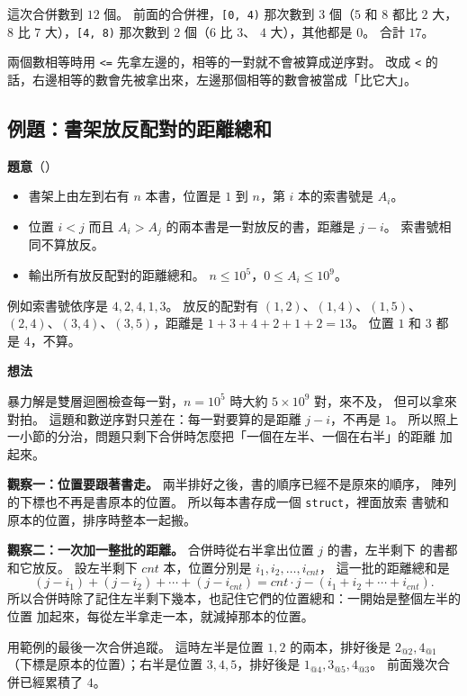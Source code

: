 這次合併數到 $12$ 個。 前面的合併裡，\texttt{[0, 4)} 那次數到 $3$ 個（$5$ 和
$8$ 都比 $2$ 大，$8$ 比 $7$ 大），\texttt{[4, 8)} 那次數到 $2$ 個（$6$ 比 $3$、
$4$ 大），其他都是 $0$。 合計 $17$。

兩個數相等時用 \texttt{<=} 先拿左邊的，相等的一對就不會被算成逆序對。 改成
\texttt{<} 的話，右邊相等的數會先被拿出來，左邊那個相等的數會被當成「比它大」。

\subsection{例題：書架放反配對的距離總和}
\label{sec:rec-ex-books}

\textbf{題意}（）

\begin{itemize}
\item 書架上由左到右有 $n$ 本書，位置是 $1$ 到 $n$，第 $i$ 本的索書號是
$A_i$。
\item 位置 $i < j$ 而且 $A_i > A_j$ 的兩本書是一對放反的書，距離是 $j - i$。
索書號相同不算放反。
\item 輸出所有放反配對的距離總和。 $n \le 10^5$，$0 \le A_i \le 10^9$。
\end{itemize}

例如索書號依序是 $4, 2, 4, 1, 3$。 放反的配對有 $(1,2)$、$(1,4)$、$(1,5)$、
$(2,4)$、$(3,4)$、$(3,5)$，距離是 $1 + 3 + 4 + 2 + 1 + 2 = 13$。 位置 $1$ 和
$3$ 都是 $4$，不算。

\textbf{想法}

暴力解是雙層迴圈檢查每一對，$n = 10^5$ 時大約 $5 \times 10^9$ 對，來不及，
但可以拿來對拍。 這題和數逆序對只差在：每一對要算的是距離 $j - i$，不再是 $1$。
所以照上一小節的分治，問題只剩下合併時怎麼把「一個在左半、一個在右半」的距離
加起來。

\textbf{觀察一：位置要跟著書走。} 兩半排好之後，書的順序已經不是原來的順序，
陣列的下標也不再是書原本的位置。 所以每本書存成一個 \texttt{struct}，裡面放索
書號和原本的位置，排序時整本一起搬。

\textbf{觀察二：一次加一整批的距離。} 合併時從右半拿出位置 $j$ 的書，左半剩下
的書都和它放反。 設左半剩下 $cnt$ 本，位置分別是 $i_1, i_2, \ldots, i_{cnt}$，
這一批的距離總和是
\[
(j - i_1) + (j - i_2) + \cdots + (j - i_{cnt}) = cnt \cdot j - (i_1 + i_2 + \cdots + i_{cnt}).
\]
所以合併時除了記住左半剩下幾本，也記住它們的位置總和：一開始是整個左半的位置
加起來，每從左半拿走一本，就減掉那本的位置。

用範例的最後一次合併追蹤。 這時左半是位置 $1, 2$ 的兩本，排好後是
$2_{@2}, 4_{@1}$（下標是原本的位置）；右半是位置 $3, 4, 5$，排好後是
$1_{@4}, 3_{@5}, 4_{@3}$。 前面幾次合併已經累積了 $4$。

